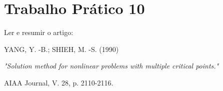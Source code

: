 


\section{Trabalho Prático 10}

Ler e resumir o artigo:

\begin{center}
	YANG, Y. -B.; SHIEH, M. -S. (1990)

	\textit{"Solution method for nonlinear problems with multiple critical points."}

	AIAA Journal, V. 28, p. 2110-2116.
\end{center}


